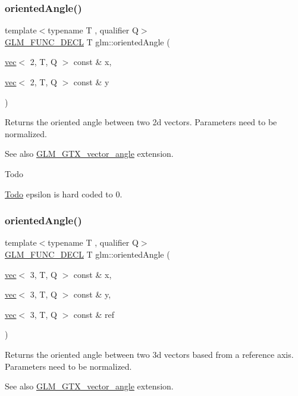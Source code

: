 \subsubsection{\texorpdfstring{oriented\+Angle()}{orientedAngle()}\hspace{0.1cm}{\footnotesize\ttfamily [1/2]}}
{\footnotesize\ttfamily template$<$typename T , qualifier Q$>$ \\
\hyperlink{setup_8hpp_ab2d052de21a70539923e9bcbf6e83a51}{G\+L\+M\+\_\+\+F\+U\+N\+C\+\_\+\+D\+E\+CL} T glm\+::oriented\+Angle (\begin{DoxyParamCaption}\item[{\hyperlink{structglm_1_1vec}{vec}$<$ 2, T, Q $>$ const \&}]{x,  }\item[{\hyperlink{structglm_1_1vec}{vec}$<$ 2, T, Q $>$ const \&}]{y }\end{DoxyParamCaption})}

Returns the oriented angle between two 2d vectors. Parameters need to be normalized. \begin{DoxySeeAlso}{See also}
\hyperlink{group__gtx__vector__angle}{G\+L\+M\+\_\+\+G\+T\+X\+\_\+vector\+\_\+angle} extension.
\end{DoxySeeAlso}
\begin{DoxyRefDesc}{Todo}
\item[\hyperlink{todo__todo000001}{Todo}]epsilon is hard coded to 0. \end{DoxyRefDesc}
\mbox{\label{group__gtx__vector__angle_ga706fce3d111f485839756a64f5a48553}} 
\subsubsection{\texorpdfstring{oriented\+Angle()}{orientedAngle()}\hspace{0.1cm}{\footnotesize\ttfamily [2/2]}}
{\footnotesize\ttfamily template$<$typename T , qualifier Q$>$ \\
\hyperlink{setup_8hpp_ab2d052de21a70539923e9bcbf6e83a51}{G\+L\+M\+\_\+\+F\+U\+N\+C\+\_\+\+D\+E\+CL} T glm\+::oriented\+Angle (\begin{DoxyParamCaption}\item[{\hyperlink{structglm_1_1vec}{vec}$<$ 3, T, Q $>$ const \&}]{x,  }\item[{\hyperlink{structglm_1_1vec}{vec}$<$ 3, T, Q $>$ const \&}]{y,  }\item[{\hyperlink{structglm_1_1vec}{vec}$<$ 3, T, Q $>$ const \&}]{ref }\end{DoxyParamCaption})}

Returns the oriented angle between two 3d vectors based from a reference axis. Parameters need to be normalized. \begin{DoxySeeAlso}{See also}
\hyperlink{group__gtx__vector__angle}{G\+L\+M\+\_\+\+G\+T\+X\+\_\+vector\+\_\+angle} extension. 
\end{DoxySeeAlso}
